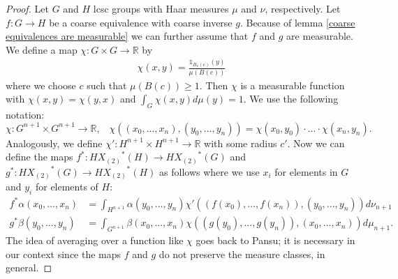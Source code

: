 \documentclass[10pt]{amsart}
\theoremstyle{plain}
\theoremstyle{definition}
\theoremstyle{remark}
\begin{document}
\begin{proof}
Let $G$ and $H$ lcsc groups with Haar measures $\mu$ and $\nu$, respectively. Let  $f\colon G\to H$ be a coarse equivalence with coarse inverse $g$. Because of lemma \ref{coarse equivalences are measurable} we can further assume that $f$ and $g$ are measurable. We define a map $\chi\colon G\times G \to \mathbb{R}$ by
\begin{align*}
\chi(x,y)=\frac{\mathds{1}_{B_x(c)}(y)}{\mu(B(c))}
\end{align*}
where we choose $c$ such that $\mu(B(c))\ge 1$. Then $\chi$ is a measurable function with
$\chi(x,y)=\chi(y,x)$ and $\int_G \chi(x,y)d\mu(y)=1$. We use the following notation:
\[\chi\colon G^{n+1}\times G^{n+1}\to \mathbb{R},\;\;\;\chi((x_0,...,x_n),(y_0,...,y_n))=\chi(x_0,y_0)\cdot...\cdot \chi(x_n,y_n).\]
 Analogously, we define $\chi'\colon H^{n+1}\times H^{n+1} \to \mathbb{R}$ with some radius $c'$. Now we can define the maps $f^*\colon {HX_{(2)}}^*(H)\to {HX_{(2)}}^*(G)$ and $g^*\colon{HX_{(2)}}^*(G)\to {HX_{(2)}}^*(H)$ as follows where we use $x_i$ for elements in $G$ and $y_i$ for elements of $H$:
\begin{align*}
f^*\alpha(x_0,...,x_n)&=\int_{H^{n+1}} \alpha(y_0,...,y_n)\chi'\left((f(x_0),...,f(x_n)),(y_0,...,y_n)\right)d\nu_{n+1}\\
g^*\beta(y_0,...,y_n)&=\int_{G^{n+1}} \beta(x_0,...,x_n)\chi\left((g(y_0),...,g(y_n)),(x_0,...,x_n)\right)d\mu_{n+1}.
\end{align*}
The idea of averaging over a function like $\chi$ goes back to Pansu; it is necessary in our context since the maps $f$ and $g$ do not preserve the measure classes, in general. 


\end{proof}
\end{document}
